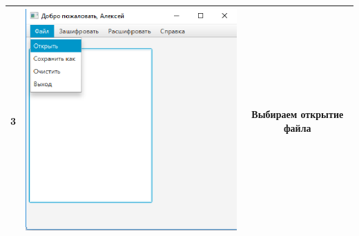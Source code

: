 \documentclass[a4paper,12pt]{article}
\begin{document}
\begin{table}[pt!]
\begin{tabular}{|c|c|c|}
	\hline 
	3 & \includegraphics[scale=0.3]{img/file/open/text_open.png} & Выбираем открытие файла\\
	\hline 
\end{tabular} 
\label{table:data_type4} 
\end{table}
\end{document}
